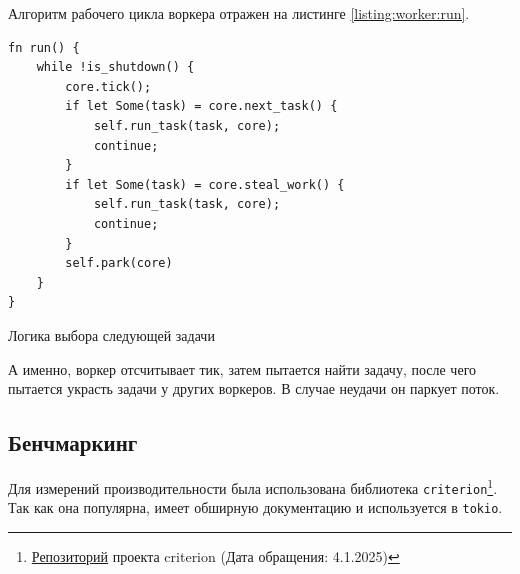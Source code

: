 Алгоритм рабочего цикла воркера отражен на листинге \ref{listing:worker:run}.

\begin{listing}[H]
    \begin{verbatim}
fn run() {
    while !is_shutdown() {
        core.tick();
        if let Some(task) = core.next_task() {
            self.run_task(task, core);
            continue;
        }
        if let Some(task) = core.steal_work() {
            self.run_task(task, core);
            continue;
        }
        self.park(core)
    }
}
    \end{verbatim}

    \caption{Логика выбора следующей задачи}
    \label{listing:worker:run}
\end{listing}

А именно, воркер отсчитывает тик, затем пытается найти задачу, после чего пытается украсть задачи у других воркеров. В случае неудачи он паркует поток.

\subsection{Бенчмаркинг}

Для измерений производительности была использована библиотека \verb|criterion|\footnote{\href{https://github.com/bheisler/criterion.rs}{Репозиторий} проекта criterion (Дата обращения: 4.1.2025)}. Так как она популярна, имеет обширную документацию и используется в \verb|tokio|.
